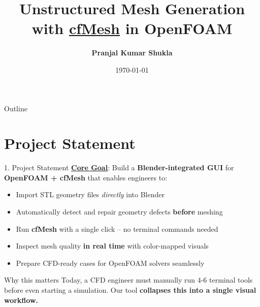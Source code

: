 \documentclass[dvipsnames,mathserif]{beamer}
\begin{document}
\rightskip\rightmargin
\title{\textbf{Unstructured Mesh Generation} \\ with \underline{cfMesh} in OpenFOAM}
\author{\Large \textbf{Pranjal Kumar Shukla}}
\footnotesize{\date{\today}}


\begin{frame}
\maketitle
\end{frame}

\begin{frame}{Outline}
\footnotesize \tableofcontents
\end{frame}


\section{Project Statement}
\begin{frame}{1. Project Statement}
    \textbf{\underline{Core Goal}}: Build a \textbf{Blender-integrated GUI} for \textbf{OpenFOAM + cfMesh} that enables engineers to:
    \vspace{0.3cm}
    \begin{itemize}
        \item Import STL geometry files \textit{directly} into Blender
        \item Automatically detect and repair geometry defects \textbf{before} meshing
        \item Run \textbf{cfMesh} with a single click -- no terminal commands needed
        \item Inspect mesh quality \textbf{in real time} with color-mapped visuals
        \item Prepare CFD-ready cases for OpenFOAM solvers seamlessly
    \end{itemize}
    \vspace{0.3cm}
    \begin{alertblock}{Why this matters}
        Today, a CFD engineer must manually run 4-6 terminal tools before even starting a simulation.
        Our tool \textbf{collapses this into a single visual workflow.}
    \end{alertblock}
\end{frame}
\end{document}
